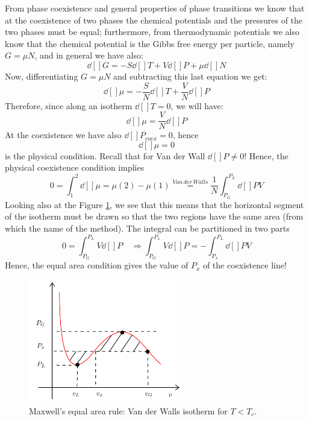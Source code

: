 \documentclass[../main/main.tex]{subfiles}
\begin{document}
From phase coexistence and general properties of phase transitions we know that at the coexistence of two phases the chemical potentials and the pressures of the two phases must be equal;  furthermore, from thermodynamic potentials we also know that the chemical potential is the Gibbs free energy per particle, namely \(G=\mu N \), and in general we have also:
\begin{equation*}
    \dd[]{G} = - S \dd[]{T} + V \dd[]{P} + \mu \dd[]{N}
\end{equation*}
Now, differentiating \(G=\mu N\) and subtracting this last equation we get:
\begin{equation*}
  \dd[]{\mu } = - \frac{S}{N} \dd[]{T} + \frac{V}{N} \dd[]{P}
\end{equation*}
Therefore, since along an isotherm  \( \dd[]{T}=0\), we will have:
\begin{equation*}
  \dd[]{\mu } = \frac{V}{N} \dd[]{P}
\end{equation*}
At the coexistence we have also \( \dd[]{P}_{coex}= 0  \), hence
\begin{equation*}
  \dd[]{\mu } = 0
\end{equation*}
is the physical condition.
Recall that for Van der Wall \( \dd[]{P} \neq 0  \)!
Hence, the physical coexistence condition implies
\begin{equation*}
  0 = \int_{1}^{2} \dd[]{\mu } = \mu (2) - \mu (1) \overset{Van\, der\, Walls}{=} \frac{1}{N} \int_{P_G}^{P_L} \dd[]{P} V
\end{equation*}
Looking also at the Figure \ref{fig:14_4}, we see that this means that the horizontal segment of the isotherm must be drawn so that the two regions have the same area (from which the name of the method).
The integral can be partitioned in two parts
\begin{equation*}
  0 = \int_{P_G}^{P_L} V \dd[]{P} \quad \Rightarrow \int_{P_G}^{P_x} V\dd[]{P} = - \int_{P_x}^{P_L} \dd[]{P} V
\end{equation*}
Hence, the equal area condition gives the value of \( P_x \) of the coexistence line!

\clearpage

\begin{figure}[h!]
\centering
\includegraphics[width=0.6\textwidth]{../lessons/14_image/5.pdf}
\caption{\label{fig:14_4} Maxwell's equal area rule: Van der Walls isotherm for \( T < T_c \).}
\end{figure}
\end{document}
